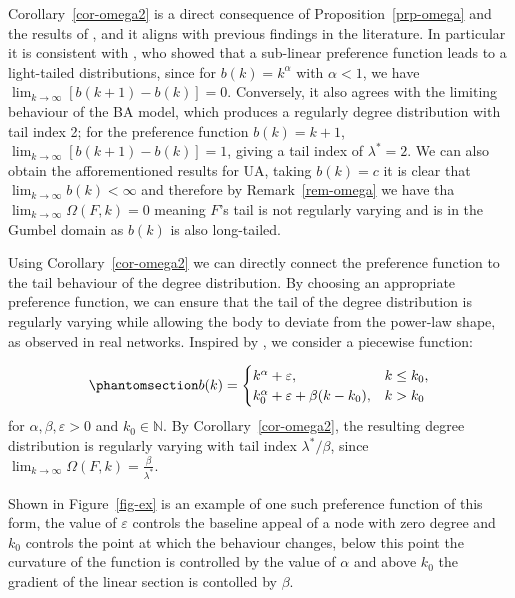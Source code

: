 \documentclass[
  sn-basic,
  10pt,
]{sn-jnl}
\theoremstyle{plain}
\theoremstyle{plain}
\theoremstyle{remark}
\begin{document}
Corollary~\ref{cor-omega2} is a direct consequence of
Proposition~\ref{prp-omega} and the results of \citet{shimura12}, and it
aligns with previous findings in the literature. In particular it is
consistent with \citet{krapivsky01}, who showed that a sub-linear
preference function leads to a light-tailed distributions, since for
\(b(k)=k^\alpha\) with \(\alpha<1\), we have
\(\lim_{k\rightarrow\infty}[b(k+1)-b(k)]=0\). Conversely, it also agrees
with the limiting behaviour of the BA model, which produces a regularly
degree distribution with tail index 2; for the preference function
\(b(k)=k+1\), \(\lim_{k\rightarrow\infty}[b(k+1)-b(k)]=1\), giving a
tail index of \(\lambda^*=2\). We can also obtain the afforementioned
results for UA, taking \(b(k)=c\) it is clear that
\(\lim_{k\rightarrow\infty}b(k)<\infty\) and therefore by
Remark~\ref{rem-omega} we have tha
\(\lim_{k\rightarrow\infty}\Omega(F,k)=0\) meaning \(F\)'s tail is not
regularly varying and is in the Gumbel domain as \(b(k)\) is also
long-tailed.

Using Corollary~\ref{cor-omega2} we can directly connect the preference
function to the tail behaviour of the degree distribution. By choosing
an appropriate preference function, we can ensure that the tail of the
degree distribution is regularly varying while allowing the body to
deviate from the power-law shape, as observed in real networks. Inspired
by \citet{Lee24}, we consider a piecewise function:

\begin{equation}\phantomsection\label{eq-pref}{
b(k) = \begin{cases}
k^\alpha + \varepsilon,&k\le k_0,\\
k_0^\alpha + \varepsilon + \beta(k-k_0), &k> k_0
\end{cases}
}\end{equation} for \(\alpha,\beta, \varepsilon>0\) and
\(k_0\in\mathbb N\). By Corollary~\ref{cor-omega2}, the resulting degree
distribution is regularly varying with tail index \(\lambda^*/\beta\),
since
\(\lim_{k\rightarrow\infty}\Omega(F,k) = \frac{\beta}{\lambda^*}\).

Shown in Figure~\ref{fig-ex} is an example of one such preference
function of this form, the value of \(\varepsilon\) controls the
baseline appeal of a node with zero degree and \(k_0\) controls the
point at which the behaviour changes, below this point the curvature of
the function is controlled by the value of \(\alpha\) and above \(k_0\)
the gradient of the linear section is contolled by \(\beta\).
\end{document}

